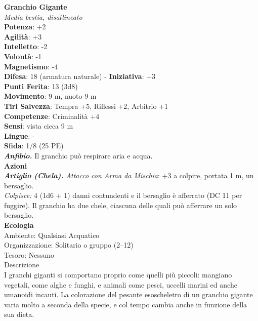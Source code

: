\begin{multicols}{2}
\medskip\textbf{Granchio Gigante}\\
\emph{Media bestia, disallineato}\\
\textbf{Potenza}: +2\\
\textbf{Agilità}: +3\\
\textbf{Intelletto}: -2\\
\textbf{Volontà}: -1\\
\textbf{Magnetismo}: -4\\
\textbf{Difesa}: 18 (armatura naturale) - \textbf{Iniziativa}: +3\\
\textbf{Punti Ferita}: 13 (3d8)\\
\textbf{Movimento}: 9 m, nuoto 9 m\\
\textbf{Tiri Salvezza}: Tempra +5, Riflessi +2, Arbitrio +1 \\
\textbf{Competenze}: Criminalità +4\\
\textbf{Sensi}: vista cieca 9 m\\
\textbf{Lingue}: -\\
\textbf{Sfida}: 1/8 (25 PE)\smallskip\\
\emph{\textbf{Anfibio.}} Il granchio può respirare aria e acqua.\\
\smallskip\textbf{Azioni}\\
\emph{\textbf{Artiglio (Chela).} Attacco con Arma da Mischia}: +3 a colpire, portata 1 m,  un bersaglio.\\
\emph{Colpisce:} 4 (1d6 + 1) danni contundenti e il bersaglio è afferrato (DC 11 per fuggire). Il granchio ha due chele, ciascuna delle quali può afferrare un solo bersaglio.\\
\textbf{Ecologia}\\
Ambiente: Qualsiasi Acquatico\\
Organizzazione: Solitario o gruppo (2–12)\\
Tesoro: Nessuno\\
Descrizione\\

I granchi giganti si comportano proprio come quelli più piccoli: mangiano vegetali, come alghe e funghi, e animali come pesci, uccelli marini ed anche umanoidi incauti. La colorazione del pesante esoscheletro di un granchio gigante varia molto a seconda della specie, e col tempo cambia anche in funzione della sua dieta. \\


\end{multicols}

